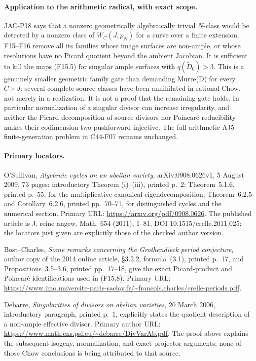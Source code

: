 \documentclass[11pt]{article}
\theoremstyle{remark}\newtheorem{remark}[theorem]{Remark}
\begin{document}
\paragraph{Application to the arithmetic radical, with exact scope.}
JAC-P18 says that a nonzero geometrically algebraically trivial
$N$-class would be detected by a nonzero class of
$W_C(J,p_N)$ for a curve over a finite extension.  F15--F16
remove all its families whose image surfaces are non-ample, or
whose resolutions have no Picard quotient beyond the ambient
Jacobian.  It is sufficient to kill the maps (F15.5) for
singular ample surfaces with $q(\widetilde D_0)>3$.
This is a genuinely smaller geometric family gate than demanding
Murre(D) for every $C\times J$: several complete source classes
have been annihilated in rational Chow, not merely in a realization.
It is not a proof that the remaining gate holds.  In particular
normalization of a singular divisor can increase irregularity,
and neither the Picard decomposition of source divisors nor
Poincar\'e reducibility makes their codimension-two pushforward
injective.  The full arithmetic AJ5 finite-generation problem in
C44-F07 remains unchanged.

\paragraph{Primary locators.}
O'Sullivan, \emph{Algebraic cycles on an abelian variety},
arXiv:0908.0626v1, 5 August 2009, 73 pages: introductory
Theorem (i)--(iii), printed p.~2; Theorem~5.1.6, printed
p.~55, for the multiplicative canonical eigendecomposition;
Theorem~6.2.5 and Corollary~6.2.6, printed pp.~70--71,
for distinguished cycles and the numerical section.
Primary URL: \url{https://arxiv.org/pdf/0908.0626}.
The published article is J. reine angew. Math. 654 (2011),
1--81, DOI 10.1515/crelle.2011.025; the locators just given
are explicitly those of the checked author version.

Bost--Charles, \emph{Some remarks concerning the Grothendieck
period conjecture}, author copy of the 2014 online article,
\S3.2.2, formula~(3.1), printed p.~17, and Propositions~3.5--3.6,
printed pp.~17--18, give the exact Picard-product and
Poincar\'e identifications used in (F15.8).
Primary URL:
\url{https://www.imo.universite-paris-saclay.fr/~francois.charles/crelle-periods.pdf}.

Debarre, \emph{Singularities of divisors on abelian varieties},
20 March 2006, introductory paragraph, printed p.~1, explicitly
states the quotient description of a non-ample effective divisor.
Primary author URL:
\url{https://www.math.ens.psl.eu/~debarre/DivVarAb.pdf}.
The proof above explains the subsequent isogeny, normalization,
and exact projector arguments; none of those Chow conclusions is
being attributed to that source.
\end{document}
